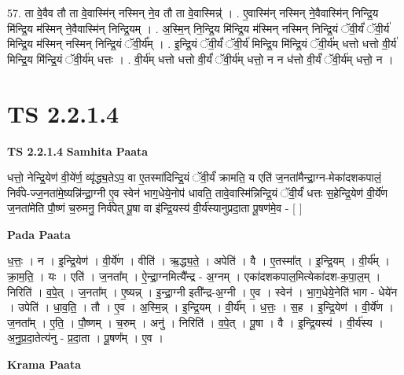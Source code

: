 \documentclass[17pt]{extarticle}
\begin{document}
57. ता वे॒वैव तौ ता वे॒वास्मि॑न् नस्मिन् ने॒व तौ ता वे॒वास्मिन्न्॑ । . ए॒वास्मि॑न् नस्मिन् ने॒वैवास्मि॑न् निन्द्रि॒य मि॑न्द्रि॒य म॑स्मिन् ने॒वैवास्मि॑न् निन्द्रि॒यम् । . अ॒स्मि॒न् नि॒न्द्रि॒य मि॑न्द्रि॒य म॑स्मिन् नस्मिन् निन्द्रि॒यं ॅवी॒र्यं॑ ॅवी॒र्य॑ मिन्द्रि॒य म॑स्मिन् नस्मिन् निन्द्रि॒यं ॅवी॒र्य᳚म् । . इ॒न्द्रि॒यं ॅवी॒र्यं॑ ॅवी॒र्य॑ मिन्द्रि॒य मि॑न्द्रि॒यं ॅवी॒र्य॑म् धत्तो धत्तो वी॒र्य॑ मिन्द्रि॒य मि॑न्द्रि॒यं ॅवी॒र्य॑म् धत्तः । . वी॒र्य॑म् धत्तो धत्तो वी॒र्यं॑ ॅवी॒र्य॑म् धत्तो॒ न न ध॑त्तो वी॒र्यं॑ ॅवी॒र्य॑म् धत्तो॒ न । \newline
\pagebreak
{}
\section*{ TS 2.2.1.4 }

\textbf{TS 2.2.1.4 } \newline
\textbf{Samhita Paata} \newline

धत्तो॒ नेन्द्रि॒येण॑ वी॒ये॑र्ण॒ व्यृ॑द्ध्य॒तेऽप॒ वा ए॒तस्मा॑दिन्द्रि॒यं ॅवी॒र्यं॑ क्रामति॒ य एति॑ ज॒नता॑मैन्द्रा॒ग्न-मेका॑दशकपालं॒ निर्व॑पे-ज्ज॒नता॑मे॒ष्यन्नि॑न्द्रा॒ग्नी ए॒व स्वेन॑ भाग॒धेये॒नोप॑ धावति॒ तावे॒वास्मि॑न्निन्द्रि॒यं ॅवी॒र्यं॑ धत्तः स॒हेन्द्रि॒येण॑ वी॒र्ये॑ण ज॒नता॑मेति पौ॒ष्णं च॒रुमनु॒ निर्व॑पेत् पू॒षा वा इ॑न्द्रि॒यस्य॑ वी॒र्य॑स्यानुप्रदा॒ता पू॒षण॑मे॒व - [  ] \newline

\textbf{Pada Paata} \newline

ध॒त्तः॒ । न । इ॒न्द्रि॒येण॑ । वी॒र्ये॑ण । वीति॑ । ऋ॒द्ध्य॒ते॒ । अपेति॑ । वै । ए॒तस्मा᳚त् । इ॒न्द्रि॒यम् । वी॒र्य᳚म् । क्रा॒म॒ति॒ । यः । एति॑ । ज॒नता᳚म् । ऐ॒न्द्रा॒ग्नमित्यै᳚न्द्र - अ॒ग्नम् । एका॑दशकपाल॒मित्येका॑दश-क॒पा॒ल॒म् । निरिति॑ । व॒पे॒त् । ज॒नता᳚म् । ए॒ष्यन्न् । इ॒न्द्रा॒ग्नी इती᳚न्द्र-अ॒ग्नी । ए॒व । स्वेन॑ । भा॒ग॒धेये॒नेति॑ भाग - धेये॑न । उपेति॑ । धा॒व॒ति॒ । तौ । ए॒व । अ॒स्मि॒न्न् । इ॒न्द्रि॒यम् । वी॒र्य᳚म् । ध॒त्तः॒ । स॒ह । इ॒न्द्रि॒येण॑ । वी॒र्ये॑ण । ज॒नता᳚म् । ए॒ति॒ । पौ॒ष्णम् । च॒रुम् । अनु॑ । निरिति॑ । व॒पे॒त् । पू॒षा । वै । इ॒न्द्रि॒यस्य॑ । वी॒र्य॑स्य । अ॒नु॒प्र॒दा॒तेत्य॑नु - प्र॒दा॒ता । पू॒षण᳚म् । ए॒व ।  \newline


\textbf{Krama Paata} \newline
\end{document}
